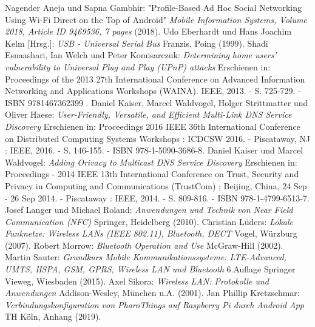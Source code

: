     \renewcommand\refname{Literaturverzeichnis}
    \begin{thebibliography}{10}
        Nagender Aneja und Sapna Gambhir: "Profile-Based Ad Hoc Social Networking Using Wi-Fi Direct on the Top of Android" {\it Mobile Information Systems, Volume 2018, Article ID 9469536, 7 pages} (2018).
         Udo Eberhardt und Hans Joachim Kelm [Hrsg.]: {\it USB - Universal Serial Bus} Franzis, Poing (1999).
         Shadi Esnaashari, Ian Welch und Peter Komisarczuk: {\it Determining home users' vulnerability to Universal Plug and Play (UPnP) attacks} Erschienen in: Proceedings of the 2013 27th International Conference on Advanced Information Networking and Applications Workshops (WAINA). IEEE, 2013. - S. 725-729. - ISBN 9781467362399 .
         Daniel Kaiser, Marcel Waldvogel, Holger Strittmatter und Oliver Haese: {\it User-Friendly, Versatile, and Efficient Multi-Link DNS Service Discovery} Erschienen in: Proceedings 2016 IEEE 36th International Conference on Distributed Computing Systems Workshops : ICDCSW 2016. - Piscataway, NJ : IEEE, 2016. - S. 146-155. - ISBN 978-1-5090-3686-8.
         Daniel Kaiser und Marcel Waldvogel: {\it Adding Orivacy to Multicast DNS Service Discovery} Erschienen in: Proceedings - 2014 IEEE 13th International Conference on Trust, Security and Privacy in Computing and Communications (TrustCom) ; Beijing, China, 24 Sep - 26 Sep 2014. - Piscataway : IEEE, 2014. - S. 809-816. - ISBN 978-1-4799-6513-7.
        Josef Langer und Michael Roland: {\it Anwendungen und Technik von Near Field Communication (NFC)} Springer, Heidelberg (2010).
        Christian Lüders: {\it Lokale Funknetze: Wireless LANs (IEEE 802.11), Bluetooth, DECT} Vogel, Würzburg (2007).
        Robert Morrow: {\it Bluetooth Operation and Use} McGraw-Hill (2002).
        Martin Sauter: {\it Grundkurs Mobile Kommunikationssysteme: LTE-Advanced, UMTS, HSPA, GSM, GPRS, Wireless LAN und Bluetooth} 6.Auflage Springer Vieweg, Wiesbaden (2015).
        Axel Sikora: {\it Wireless LAN: Protokolle und Anwendungen} Addison-Wesley, München u.A. (2001).
		 Jan Phillip Kretzschmar: {\it Verbindungskonfiguration von PharoThings auf Raspberry Pi durch Android App} TH Köln, Anhang (2019).
    \end{thebibliography}
    \pagebreak
    
